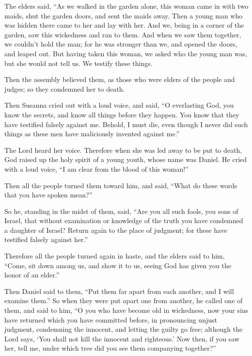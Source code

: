  The elders said, ``As we walked in the garden alone, this
woman came in with two maids, shut the garden doors, and sent the maids
away.  Then a young man who was hidden there came to her
and lay with her.  And we, being in a corner of the garden,
saw this wickedness and ran to them.  And when we saw them
together, we couldn't hold the man; for he was stronger than we, and
opened the doors, and leaped out.  But having taken this
woman, we asked who the young man was, but she would not tell us. We
testify these things.

 Then the assembly believed them, as those who were elders
of the people and judges; so they condemned her to death.

 Then Susanna cried out with a loud voice, and said, ``O
everlasting God, you know the secrets, and know all things before they
happen.  You know that they have testified falsely against
me. Behold, I must die, even though I never did such things as these men
have maliciously invented against me.''

 The Lord heard her voice.  Therefore when she
was led away to be put to death, God raised up the holy spirit of a
young youth, whose name was Daniel.  He cried with a loud
voice, ``I am clear from the blood of this woman!''

 Then all the people turned them toward him, and said,
``What do these words that you have spoken mean?''

 So he, standing in the midst of them, said, ``Are you all
such fools, you sons of Israel, that without examination or knowledge of
the truth you have condemned a daughter of Israel?  Return
again to the place of judgment; for these have testified falsely against
her.''

 Therefore all the people turned again in haste, and the
elders said to him, ``Come, sit down among us, and show it to us, seeing
God has given you the honor of an elder.''

 Then Daniel said to them, ``Put them far apart from each
another, and I will examine them.''  So when they were put
apart one from another, he called one of them, and said to him, ``O you
who have become old in wickedness, now your sins have returned which you
have committed before,  in pronouncing unjust judgment,
condemning the innocent, and letting the guilty go free; although the
Lord says, `You shall not kill the innocent and righteous.'
 Now then, if you saw her, tell me, under which tree did
you see them companying together?''

